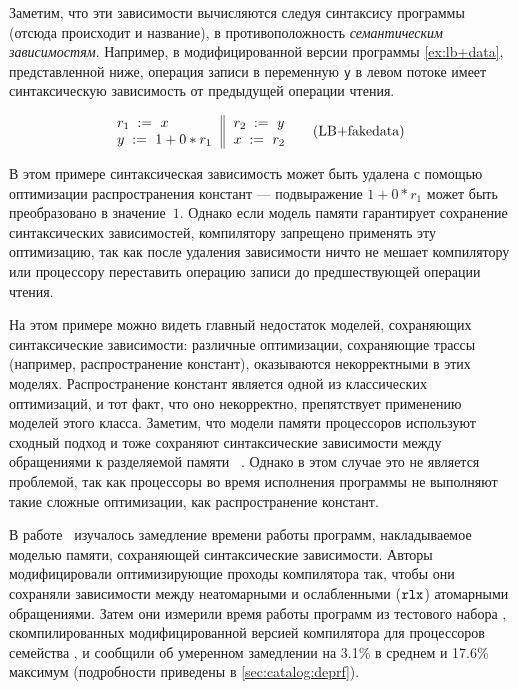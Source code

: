 Заметим, что эти зависимости вычисляются следуя 
синтаксису программы (отсюда происходит и название), 
в противоположность \emph{семантическим зависимостям}. 
Например, в модифицированной версии 
программы \ref{ex:lb+data}, представленной ниже, 
операция записи в переменную \texttt{y} в левом потоке имеет синтаксическую зависимость от предыдущей операции чтения. 

\begin{equation*}
\inarrII{
  \readInst{}{r_1}{x}           \\
  \writeInst{}{y}{1 + 0 * r_1}  \\
}{
  \readInst{}{r_2}{y}      \\
  \writeInst{}{x}{r_2}     \\
}
\tag{LB+fakedata}\label{ex:lb+fakedata}
\end{equation*}

В этом примере синтаксическая зависимость может быть удалена
с помощью оптимизации распространения констант ---
подвыражение ${1 + 0 * r_1}$ может быть преобразовано в значение~$1$.
Однако если модель памяти гарантирует сохранение синтаксических зависимостей,
компилятору запрещено применять эту оптимизацию, 
так как после удаления зависимости ничто не мешает компилятору или процессору 
переставить операцию записи до предшествующей операции чтения.  

На этом примере можно видеть главный недостаток моделей, 
сохраняющих синтаксические зависимости: 
различные оптимизации, сохраняющие трассы
(например, распространение констант), оказываются некорректными в этих моделях. 
Распространение констант является одной из 
классических оптимизаций, и тот факт, 
что оно некорректно, препятствует применению моделей этого класса. 
Заметим, что модели памяти процессоров 
используют сходный подход и тоже 
сохраняют синтаксические зависимости 
между обращениями к разделяемой памяти%
~\cite{Sarkar-al:PLDI11, Alglave-al:TOPLAS14, Pulte-al:POPL18}.
Однако в этом случае это не является проблемой, 
так как процессоры во время исполнения программы 
не выполняют такие сложные оптимизации, 
как распространение констант.

В работе~\cite{Ou-Demsky:OOPSLA18} изучалось 
замедление времени работы программ, накладываемое моделью памяти, 
сохраняющей синтаксические зависимости. 
Авторы модифицировали оптимизирующие проходы компилятора так, 
чтобы они сохраняли зависимости между 
неатомарными и ослабленными ($\mathtt{rlx}$) атомарными обращениями. 
Затем они измерили время работы программ из тестового набора \SPECCPU,
скомпилированных модифицированной версией компилятора \LLVM 
для процессоров семейства , и сообщили 
об умеренном замедлении на 3.1\% в среднем и 17.6\% максимум
(подробности приведены в \ref{sec:catalog:deprf}). 

